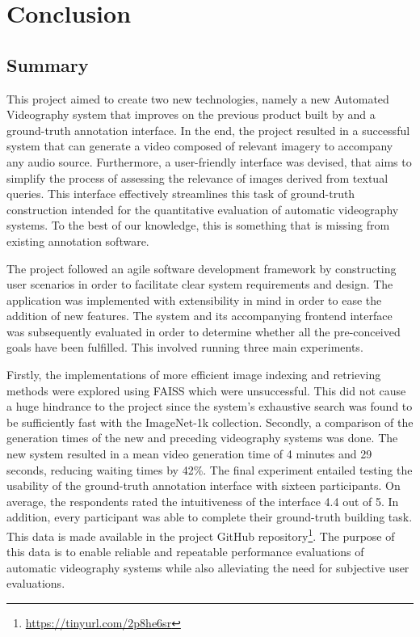 \documentclass{l4proj}
\begin{document}
\chapter{Conclusion}    
\section{Summary}
This project aimed to create two new technologies, namely a new Automated Videography system that improves on the previous product built by \cite{parker} and a ground-truth annotation interface. In the end, the project resulted in a successful system that can generate a video composed of relevant imagery to accompany any audio source. Furthermore, a user-friendly interface was devised, that aims to simplify the process of assessing the relevance of images derived from textual queries. This interface effectively streamlines this task of ground-truth construction intended for the quantitative evaluation of automatic videography systems. To the best of our knowledge, this is something that is missing from existing annotation software.


The project followed an agile software development framework by constructing user scenarios in order to facilitate clear system requirements and design. The application was implemented with extensibility in mind in order to ease the addition of new features. The system and its accompanying frontend interface was subsequently evaluated in order to determine whether all the pre-conceived goals have been fulfilled. This involved running three main experiments. 

Firstly, the implementations of more efficient image indexing and retrieving methods were explored using FAISS which were unsuccessful. This did not cause a huge hindrance to the project since the system's exhaustive search was found to be sufficiently fast with the ImageNet-1k collection. Secondly, a comparison of the generation times of the new and preceding videography systems was done. The new system resulted in a mean video generation time of 4 minutes and 29 seconds, reducing waiting times by 42\%. The final experiment entailed testing the usability of the ground-truth annotation interface with sixteen participants. On average, the respondents rated the intuitiveness of the interface 4.4 out of 5. In addition, every participant was able to complete their ground-truth building task. This data is made available in the project GitHub repository\footnote{\url{https://tinyurl.com/2p8he6sr}}. The purpose of this data is to enable reliable and repeatable performance evaluations of automatic videography systems while also alleviating the need for subjective user evaluations.
\end{document}
